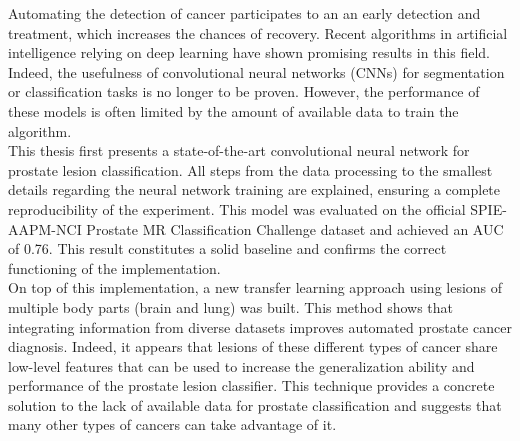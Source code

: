 Automating the detection of cancer participates to an an early detection and treatment, which increases the chances of recovery. Recent algorithms in artificial intelligence relying on deep learning have shown promising results in this field. Indeed, the usefulness of convolutional neural networks (CNNs) for segmentation or classification tasks is no longer to be proven. However, the performance of these models is often limited by the amount of available data to train the algorithm.\\
This thesis first presents a state-of-the-art convolutional neural network for prostate lesion classification. All steps from the data processing to the smallest details regarding the neural network training are explained, ensuring a complete reproducibility of the experiment. This model was evaluated on the official SPIE-AAPM-NCI Prostate MR Classification Challenge dataset and achieved an AUC of 0.76. This result constitutes a solid baseline and confirms the correct functioning of the implementation.\\
On top of this implementation, a new transfer learning approach using lesions of multiple body parts (brain and lung) was built. This method shows that integrating information from diverse datasets improves automated prostate cancer diagnosis. Indeed, it appears that lesions of these different types of cancer share low-level features that can be used to increase the generalization ability and performance of the prostate lesion classifier. This technique provides a concrete solution to the lack of available data for prostate classification and suggests that many other types of cancers can take advantage of it.
